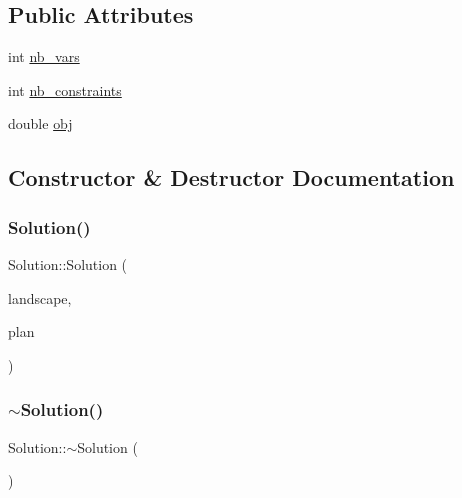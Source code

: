 \subsection*{Public Attributes}
\begin{DoxyCompactItemize}
\item 
int \hyperlink{class_solution_ada3534c6614de6c21ed6406ead921ca2}{nb\+\_\+vars}
\item 
int \hyperlink{class_solution_a12d788f2b7fa64050d2e3c0e3f4464f3}{nb\+\_\+constraints}
\item 
double \hyperlink{class_solution_a261a9de1b33f8ec6219a88073aea29e9}{obj}
\end{DoxyCompactItemize}


\subsection{Constructor \& Destructor Documentation}
\mbox{\label{class_solution_ab52c6ac6bed551f63788a5da6af7becc}} 
\subsubsection{\texorpdfstring{Solution()}{Solution()}}
{\footnotesize\ttfamily Solution\+::\+Solution (\begin{DoxyParamCaption}\item[{const \hyperlink{class_landscape}{Landscape} \&}]{landscape,  }\item[{const \hyperlink{class_restoration_plan}{Restoration\+Plan} \&}]{plan }\end{DoxyParamCaption})\hspace{0.3cm}{\ttfamily [inline]}}

\mbox{\label{class_solution_a5d245f7409aacf6ace5e965b7879a580}} 
\subsubsection{\texorpdfstring{$\sim$\+Solution()}{~Solution()}}
{\footnotesize\ttfamily Solution\+::$\sim$\+Solution (\begin{DoxyParamCaption}{ }\end{DoxyParamCaption})\hspace{0.3cm}{\ttfamily [inline]}}



